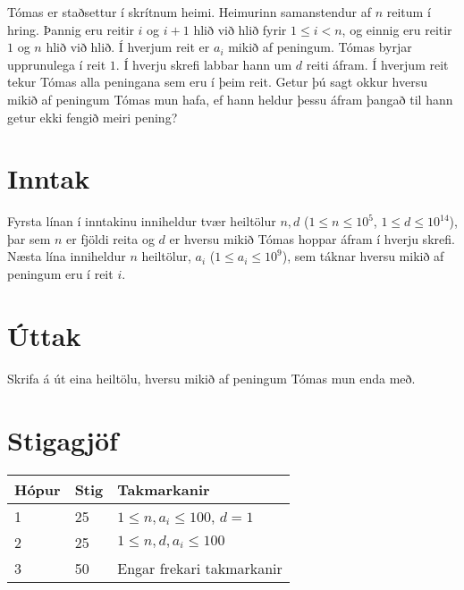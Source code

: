 
Tómas er staðsettur í skrítnum heimi. Heimurinn samanstendur af $n$ reitum í hring. Þannig
eru reitir $i$ og $i+1$ hlið við hlið fyrir $1 \leq i < n$, og einnig eru reitir $1$ og $n$ hlið
við hlið. Í hverjum reit er $a_i$ mikið af peningum. Tómas byrjar upprunulega í reit $1$. Í hverju
skrefi labbar hann um $d$ reiti áfram. Í hverjum reit tekur Tómas alla peningana sem eru í þeim reit.
Getur þú sagt okkur hversu mikið af peningum Tómas mun hafa, ef hann heldur
þessu áfram þangað til hann getur ekki fengið meiri pening?

\section*{Inntak}
Fyrsta línan í inntakinu inniheldur tvær heiltölur $n,d$ ($1 \leq n \leq 10^5$, $1 \leq d \leq 10^{14}$),
þar sem $n$ er fjöldi reita og $d$ er hversu mikið
Tómas hoppar áfram í hverju skrefi. \\

Næsta lína inniheldur $n$ heiltölur, $a_i$ ($1 \leq a_i \leq 10^9$), sem
táknar hversu mikið af peningum eru í reit $i$. \\

\section*{Úttak}
Skrifa á út eina heiltölu, hversu mikið af peningum Tómas mun enda með.

\section*{Stigagjöf}
\begin{tabular}{|l|l|l|}
\hline
Hópur & Stig & Takmarkanir \\ \hline
1     & 25   & $1 \leq n, a_i \leq 100$, $d = 1$ \\ \hline
2     & 25   & $1 \leq n, d, a_i \leq 100$ \\ \hline
3     & 50   & Engar frekari takmarkanir \\ \hline
\end{tabular}

